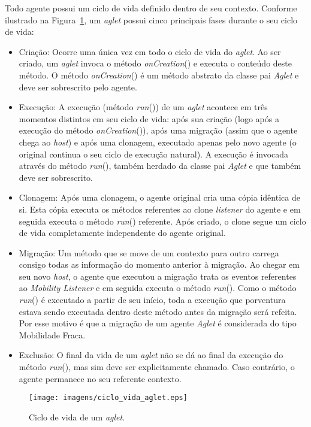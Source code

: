 	Todo agente possui um ciclo de vida definido dentro de seu contexto. Conforme ilustrado na Figura~\ref{fig:ciclo}, um \textit{aglet} possui cinco principais fases durante o seu ciclo de vida:
\begin{itemize}

	\item Criação: Ocorre uma única vez em todo o ciclo de vida do \textit{aglet}. Ao ser criado, um \textit{aglet} invoca o método \textit{onCreation}() e executa o conteúdo deste método. O método \textit{onCreation}() é um método abstrato da classe pai \textit{Aglet} e deve ser sobrescrito pelo agente.

	\item Execução: A execução (método \textit{run}()) de um \textit{aglet} acontece em três momentos distintos em seu ciclo de vida: após sua criação (logo após a execução do método \textit{onCreation}()), após uma migração (assim que o agente chega ao \textit{host}) e após uma clonagem, executado apenas pelo novo agente (o original continua o seu ciclo de execução natural). A execução é invocada através do método \textit{run}(), também herdado da classe pai \textit{Aglet} e que também deve ser sobrescrito.

	\item Clonagem:  Após uma clonagem, o agente original cria uma cópia idêntica de si. Esta cópia executa os métodos referentes ao clone \textit{listener} do agente e em seguida executa o método \textit{run}() referente. Após criado, o clone segue um ciclo de vida completamente independente do agente original.

	\item Migração: Um método que se move de um contexto para outro carrega consigo todas as informação do momento anterior à migração. Ao chegar em seu novo \textit{host}, o agente que executou a migração trata os eventos referentes ao \textit{Mobility Listener} e em seguida executa o método \textit{run}(). Como o método \textit{run}() é executado a partir de seu início, toda a execução que porventura estava sendo executada dentro deste método antes da migração será refeita. Por esse motivo é que a migração de um agente \textit{Aglet} é considerada do tipo Mobilidade Fraca.

	\item Exclusão: O final da vida de um \textit{aglet} não se dá ao final da execução do método \textit{run}(), mas sim deve ser explicitamente chamado. Caso contrário, o agente permanece no seu referente contexto.
\end{itemize}
\begin{figure}[htb]
  \centering
  \centerline{\texttt{[image: imagens/ciclo\_vida\_aglet.eps]}}
  \caption{Ciclo de vida de um \textit{aglet}.}
\label{fig:ciclo}
\end{figure}	


